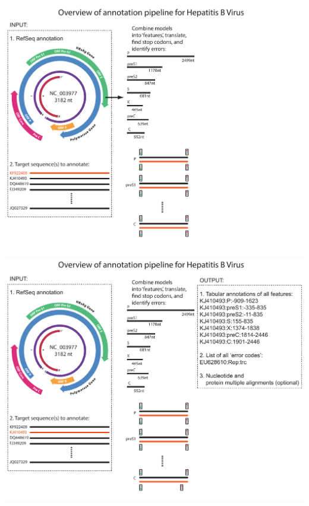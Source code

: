\documentclass[landscape]{slides}
\begin{document}
\begin{slide}
\begin{center}
\includegraphics[width=10in]{figs/annotation-schematic-hbv-3}
\end{center}
\vfill
\end{slide}
\begin{slide}
\begin{center}
\includegraphics[width=10in]{figs/annotation-schematic-hbv-4}
\end{center}
\vfill
\end{slide}
\end{document}

